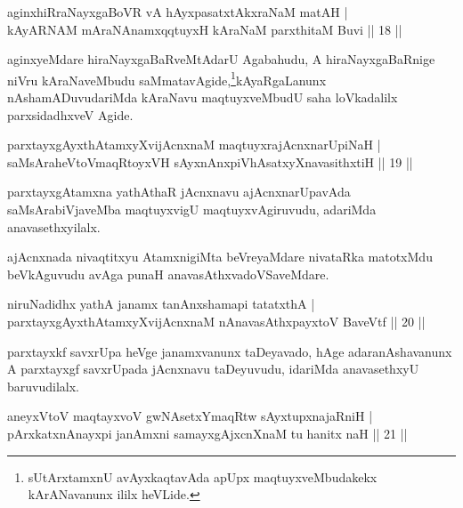 
\begin{shl}
aginxhiRraNayxgaBoVR vA hAyxpasatxtAkxraNaM matAH |\\
kAyARNAM mAraNAnamxqqtuyxH kAraNaM parxthitaM Buvi \hfill || 18 ||
\end{shl}

\begin{artha}
aginxyeMdare hiraNayxgaBaRveMtAdarU Agabahudu, A hiraNayxgaBaRnige niVru kAraNaveMbudu 
saMmatavAgide,\footnote{sUtArxtamxnU avAyxkaqtavAda apUpx maqtuyxveMbudakekx kArANavanunx  
ililx heVLide.}kAyaRgaLanunx nAshamADuvudariMda kAraNavu maqtuyxveMbudU saha loVkadalilx parxsidadhxveV Agide.
\end{artha}


\begin{shl}
parxtayxgAyxthAtamxyXvijAcnxnaM maqtuyxrajAcnxnarUpiNaH |\\
saMsAraheVtoVmaqRtoyxVH sAyxnAnxpiVhAsatxyXnavasithxtiH \hfill || 19 ||
\end{shl}

\begin{artha}
parxtayxgAtamxna yathAthaR jAcnxnavu ajAcnxnarUpavAda saMsArabiVjaveMba maqtuyxvigU maqtuyxvAgiruvudu, adariMda anavasethxyilalx.
\end{artha}

\begin{artha}
ajAcnxnada nivaqtitxyu AtamxnigiMta beVreyaMdare nivataRka matotxMdu beVkAguvudu avAga 
punaH anavasAthxvadoVSaveMdare.
\end{artha}


\begin{shl}
niruNadidhx yathA janamx tanAnxshamapi tatatxthA |\\
parxtayxgAyxthAtamxyXvijAcnxnaM nAnavasAthx\s payxtoV BaveVtf \hfill || 20 ||
\end{shl}

\begin{artha}
parxtayxkf savxrUpa heVge janamxvanunx taDeyavado, hAge adaranAshavanunx A parxtayxgf 
savxrUpada jAcnxnavu taDeyuvudu, idariMda anavasethxyU baruvudilalx.
\end{artha}

\begin{shl}
aneyxV\s toV maqtayxvoV gwNAsetxYmaqRtw sAyxtupxnajaRniH |\\
pArxkatxnAnayxpi janAmxni samayxgAjxcnXnaM tu hanitx naH \hfill || 21 ||
\end{shl}

